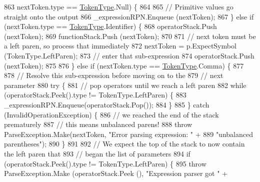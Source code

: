 \begin{DoxyCode}
863                         nextToken.type == \hyperlink{a00029_a301aa7c866593a5b625a8fc158bbeace}{TokenType}.Null) \{
864 
865                         \textcolor{comment}{// Primitive values go straight onto the output}
866                         \_expressionRPN.Enqueue (nextToken);
867                     \} \textcolor{keywordflow}{else} \textcolor{keywordflow}{if} (nextToken.type == \hyperlink{a00029_a301aa7c866593a5b625a8fc158bbeace}{TokenType}.Identifier) \{
868                         operatorStack.Push (nextToken);
869                         functionStack.Push (nextToken);
870 
871                         \textcolor{comment}{// next token must be a left paren, so process that immediately}
872                         nextToken = p.ExpectSymbol (TokenType.LeftParen);
873                         \textcolor{comment}{// enter that sub-expression}
874                         operatorStack.Push (nextToken);
875 
876                     \} \textcolor{keywordflow}{else} \textcolor{keywordflow}{if} (nextToken.type == \hyperlink{a00029_a301aa7c866593a5b625a8fc158bbeace}{TokenType}.Comma) \{
877 
878                         \textcolor{comment}{// Resolve this sub-expression before moving on to the}
879                         \textcolor{comment}{// next parameter}
880                         \textcolor{keywordflow}{try} \{
881                             \textcolor{comment}{// pop operators until we reach a left paren}
882                             \textcolor{keywordflow}{while} (operatorStack.Peek().type != TokenType.LeftParen) \{
883                                 \_expressionRPN.Enqueue(operatorStack.Pop());
884                             \}
885                         \} \textcolor{keywordflow}{catch} (InvalidOperationException) \{
886                             \textcolor{comment}{// we reached the end of the stack prematurely}
887                             \textcolor{comment}{// this means unbalanced parens!}
888                             \textcolor{keywordflow}{throw} ParseException.Make(nextToken, \textcolor{stringliteral}{"Error parsing expression: "} +
889                                 \textcolor{stringliteral}{"unbalanced parentheses"});
890                         \}
891 
892                         \textcolor{comment}{// We expect the top of the stack to now contain the left paren that }
893                         \textcolor{comment}{// began the list of parameters}
894                         \textcolor{keywordflow}{if} (operatorStack.Peek().type != TokenType.LeftParen) \{
895                             \textcolor{keywordflow}{throw} ParseException.Make (operatorStack.Peek (), \textcolor{stringliteral}{"Expression parser got "} +

\end{DoxyCode}
